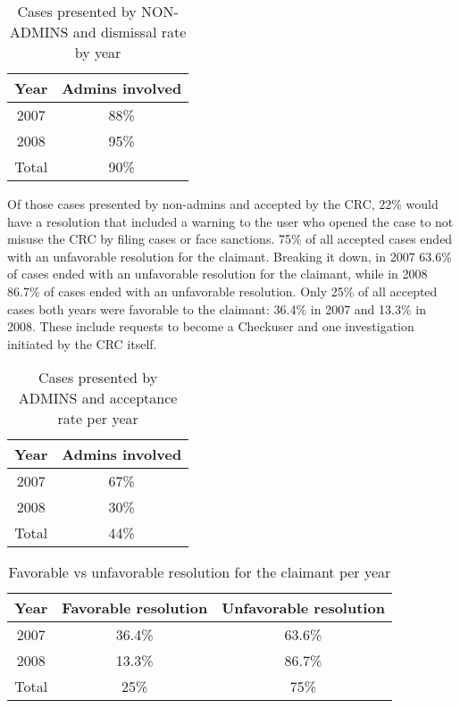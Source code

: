 \documentclass{sigchi}
\newcommand\tabhead[1]{\small\textbf{#1}}
\begin{document}
\begin{table}
  \centering
  \begin{tabular}{|c|c|}
    \hline
    \multicolumn{1}{|p{0.15\columnwidth}|}{\centering\tabhead{Year}} &
    \multicolumn{1}{|p{0.2\columnwidth}|}{\centering\tabhead{Admins involved}} \\
    \hline
    2007 & 88\% \\
    \hline
    2008 & 95\% \\
    \hline
    Total & 90\% \\
    \hline
  \end{tabular}
  \caption{Cases presented by NON-ADMINS and dismissal rate by year}
  \label{tab:table2}
\end{table}

Of those cases presented by non-admins and accepted by the CRC, 22\% would have a resolution 
that included a warning to the user who opened the case to not misuse the CRC by filing cases 
or face sanctions. 75\% of all accepted cases ended with an unfavorable resolution for the
claimant. Breaking it down, in 2007 63.6\% of cases ended with an unfavorable resolution for the
claimant, while in 2008 86.7\% of cases ended with an unfavorable resolution. Only 25\% of all
accepted cases both years were favorable to the claimant: 36.4\% in 2007 and 13.3\% in 2008. 
These include requests to become a Checkuser and one investigation initiated by the CRC itself.

\begin{table}
  \centering
  \begin{tabular}{|c|c|}
    \hline
    \multicolumn{1}{|p{0.15\columnwidth}|}{\centering\tabhead{Year}} &
    \multicolumn{1}{|p{0.2\columnwidth}|}{\centering\tabhead{Admins involved}} \\
    \hline
    2007 & 67\% \\
    \hline
    2008 & 30\% \\
    \hline
    Total & 44\% \\
    \hline
  \end{tabular}
  \caption{Cases presented by ADMINS and acceptance rate per year}
  \label{tab:table3}
\end{table}

\begin{table}
  \centering
  \begin{tabular}{|c|c|c|}
    \hline
    \multicolumn{1}{|p{0.15\columnwidth}|}{\centering\tabhead{Year}} &
    \multicolumn{1}{|p{0.25\columnwidth}|}{\centering\tabhead{Favorable resolution}} &
    \multicolumn{1}{|p{0.25\columnwidth}|}{\centering\tabhead{Unfavorable resolution}} \\
    \hline
    2007 & 36.4\% & 63.6\%\\
    \hline
    2008 & 13.3\% & 86.7\%\\
    \hline
    Total & 25\% & 75\%\\
    \hline
  \end{tabular}
  \caption{Favorable vs unfavorable resolution for the claimant per year}
  \label{tab:table4}
\end{table}
\end{document}

